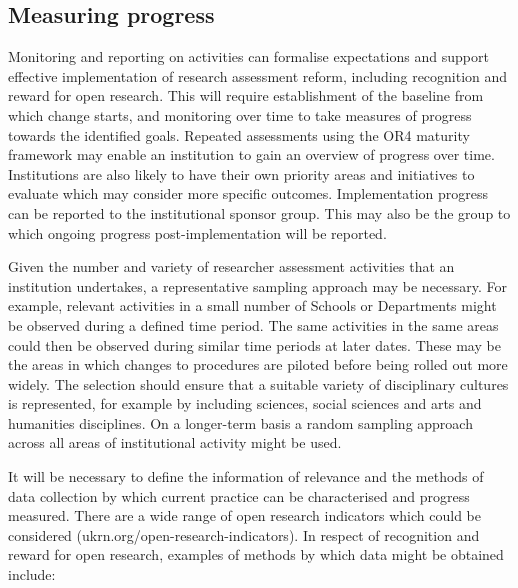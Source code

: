 \documentclass[
  letterpaper,
  DIV=11,
  numbers=noendperiod,
  oneside]{scrreprt}
\begin{document}
\subsection{Measuring progress}\label{measuring-progress}

Monitoring and reporting on activities can formalise expectations and
support effective implementation of research assessment reform,
including recognition and reward for open research. This will require
establishment of the baseline from which change starts, and monitoring
over time to take measures of progress towards the identified goals.
Repeated assessments using the OR4 maturity framework may enable an
institution to gain an overview of progress over time. Institutions are
also likely to have their own priority areas and initiatives to evaluate
which may consider more specific outcomes. Implementation progress can
be reported to the institutional sponsor group. This may also be the
group to which ongoing progress post-implementation will be reported.

Given the number and variety of researcher assessment activities that an
institution undertakes, a representative sampling approach may be
necessary. For example, relevant activities in a small number of Schools
or Departments might be observed during a defined time period. The same
activities in the same areas could then be observed during similar time
periods at later dates. These may be the areas in which changes to
procedures are piloted before being rolled out more widely. The
selection should ensure that a suitable variety of disciplinary cultures
is represented, for example by including sciences, social sciences and
arts and humanities disciplines. On a longer-term basis a random
sampling approach across all areas of institutional activity might be
used.

It will be necessary to define the information of relevance and the
methods of data collection by which current practice can be
characterised and progress measured. There are a wide range of open
research indicators which could be considered
(ukrn.org/open-research-indicators). In respect of recognition and
reward for open research, examples of methods by which data might be
obtained include:
\end{document}
